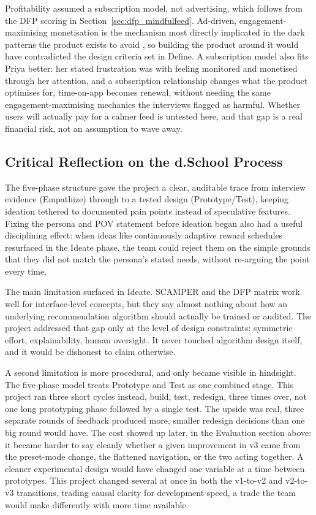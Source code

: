 \documentclass[11pt]{article}
\begin{document}
Profitability assumed a subscription model, not advertising, which follows from the DFP scoring in Section~\ref{sec:dfp_mindfulfeed}. Ad-driven, engagement-maximising monetisation is the mechanism most directly implicated in the dark patterns the product exists to avoid \parencites[2]{5127387}, so building the product around it would have contradicted the design criteria set in Define. A subscription model also fits Priya better: her stated frustration was with feeling monitored and monetised through her attention, and a subscription relationship changes what the product optimises for, time-on-app becomes renewal, without needing the same engagement-maximising mechanics the interviews flagged as harmful. Whether users will actually pay for a calmer feed is untested here, and that gap is a real financial risk, not an assumption to wave away.

\subsection{Critical Reflection on the d.School Process}
\label{sec:dschool_critical_reflection}
The five-phase structure gave the project a clear, auditable trace from interview evidence (Empathize) through to a tested design (Prototype/Test), keeping ideation tethered to documented pain points instead of speculative features. Fixing the persona and POV statement before ideation began also had a useful disciplining effect: when ideas like continuously adaptive reward schedules resurfaced in the Ideate phase, the team could reject them on the simple grounds that they did not match the persona's stated needs, without re-arguing the point every time.

The main limitation surfaced in Ideate. SCAMPER and the DFP matrix work well for interface-level concepts, but they say almost nothing about how an underlying recommendation algorithm should actually be trained or audited. The project addressed that gap only at the level of design constraints: symmetric effort, explainability, human oversight. It never touched algorithm design itself, and it would be dishonest to claim otherwise.

A second limitation is more procedural, and only became visible in hindsight. The five-phase model treats Prototype and Test as one combined stage. This project ran three short cycles instead, build, test, redesign, three times over, not one long prototyping phase followed by a single test. The upside was real, three separate rounds of feedback produced more, smaller redesign decisions than one big round would have. The cost showed up later, in the Evaluation section above: it became harder to say cleanly whether a given improvement in v3 came from the preset-mode change, the flattened navigation, or the two acting together. A cleaner experimental design would have changed one variable at a time between prototypes. This project changed several at once in both the v1-to-v2 and v2-to-v3 transitions, trading causal clarity for development speed, a trade the team would make differently with more time available.
\end{document}
